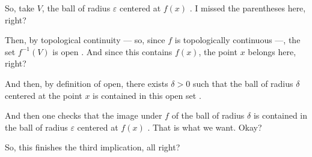 \begin{speech}[00:03:55 - 00:05:25]
So, take $V$, the ball of radius $\varepsilon$ centered at $f(x)$ . I missed the parentheses here, right?

Then, by topological continuity --- so, since $f$ is topologically continuous  ---, the set $f^{-1}(V)$ is open . And since this contains $f(x)$, the point $x$ belongs here, right? 

And then, by definition of open, there exists $\delta > 0$  such that the ball of radius $\delta$ centered at the point $x$ is contained in this open set .

And then one checks that the image under $f$ of the ball of radius $\delta$ is contained in the ball of radius $\varepsilon$ centered at $f(x)$ . That is what we want. Okay? 

So, this finishes the third implication, all right?
\end{speech}

